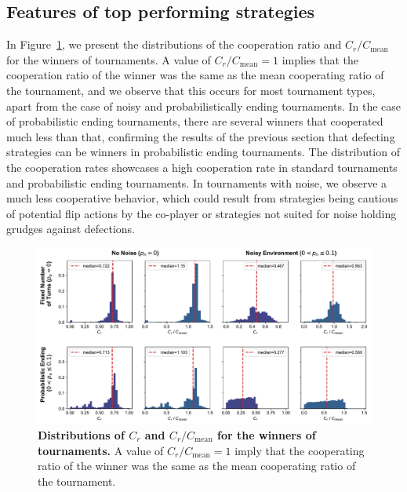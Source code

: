 \documentclass{article}
\begin{document}
\subsection{Features of top performing strategies}\label{section:winning_features}

In Figure~\ref{fig:discussion_cooperation_measures}, we present the
distributions of the cooperation ratio and \(C_r / C_{\text{mean}}\) for the
winners of tournaments. A value of \(C_r / C_{\text{mean}} = 1\) implies that
the cooperation ratio of the winner was the same as the mean cooperating ratio
of the tournament, and we observe that this occurs for most tournament types,
apart from the case of noisy and probabilistically ending tournaments. In the case of
probabilistic ending tournaments, there are several winners that cooperated much
less than that, confirming the results of the previous section that defecting
strategies can be winners in probabilistic ending tournaments. The distribution
of the cooperation rates showcases a high cooperation rate in standard
tournaments and probabilistic ending tournaments. In tournaments with noise, we
observe a much less cooperative behavior, which could result from strategies
being cautious of potential flip actions by the co-player or strategies not
suited for noise holding grudges against defections.

\begin{figure}[!htbp]
    \centering
        \centering
        \includegraphics[width=\textwidth]{../images/features_result.pdf}
        \caption{\textbf{Distributions of \(C_r\) and \(C_r / C_{\text{mean}}\)
        for the winners of tournaments.} A value of \(C_r / C_{\text{mean}} =
        1\) imply that the cooperating ratio of the winner was the same as the
        mean cooperating ratio of the tournament.}
        \label{fig:discussion_cooperation_measures}
\end{figure}
\end{document}
